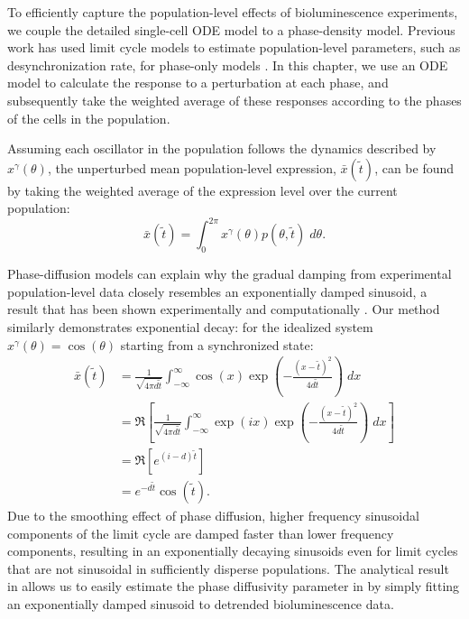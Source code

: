 To efficiently capture the population-level effects of bioluminescence experiments, we couple the detailed single-cell ODE model to a phase-density model.
Previous work has used limit cycle models to estimate population-level parameters, such as desynchronization rate, for phase-only models \cite{Rougemont2007}.
In this chapter, we use an ODE model to calculate the response to a perturbation at each phase, and subsequently take the weighted average of these responses according to the phases of the cells in the population.

Assuming each oscillator in the population follows the dynamics described by $x^\gamma(\theta)$, the unperturbed mean population-level expression, $\bar{x}(\tilde{t})$, can be found by taking the weighted average of the expression level over the current population:
\begin{equation}
  \bar{x}(\tilde{t}) = \int_0^{2\pi} x^\gamma(\theta) p(\theta, \tilde{t}) \; d\theta.
  \label{eq:xbar}
\end{equation}

Phase-diffusion models can explain why the gradual damping from experimental population-level data closely resembles an exponentially damped sinusoid, a result that has been shown experimentally \cite{Welsh2004} and computationally \cite{Rougemont2007}.
Our method similarly demonstrates exponential decay: for the idealized system $x^\gamma(\theta) = \cos(\theta)$ starting from a synchronized state:
\begin{align}
  \bar{x}(\tilde{t}) &= \frac{1}{\sqrt{4\pi d\tilde{t}}}\int_{-\infty}^{\infty} \cos(x) \exp\left(-\frac{(x - \tilde{t})^2}{4d\tilde{t}}\right)\; dx \\
  &= \Re\left[\frac{1}{\sqrt{4\pi d\tilde{t}}}\int_{-\infty}^{\infty} \exp(ix) \exp\left(-\frac{(x - \tilde{t})^2}{4d\tilde{t}}\right)\; dx\right] \\
    &= \Re\left[e^{(i - d)\tilde{t}}\right]\\
    &= e^{-d\tilde{t}} \cos(\tilde{t}).
    \label{eq:expsin}
\end{align}
Due to the smoothing effect of phase diffusion, higher frequency sinusoidal components of the limit cycle are damped faster than lower frequency components, resulting in an exponentially decaying sinusoids even for limit cycles that are not sinusoidal in sufficiently disperse populations.
The analytical result in  allows us to easily estimate the phase diffusivity parameter in  by simply fitting an exponentially damped sinusoid to detrended bioluminescence data.


